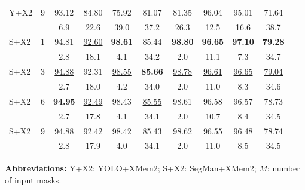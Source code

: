 \documentclass[preprint,12pt]{elsarticle}
\begin{document}
\begin{table}[t]
\begin{tabular}{lccccccccc}
\rowcolor{gray!12}
Y+X2
 & 9
 & 93.12 & 84.80 & 75.92 & 81.07
 & 81.35 & 96.04 & 95.01 & 71.64 \\\rowcolor{gray!12}
 &
 & 6.9 & 22.6 & 39.0 & 37.2
 & 26.3 & 12.5 & 16.6 & 38.7 \\

\midrule

S+X2
 & 1
 & 94.81 & \underline{92.60} & \textbf{98.61} & 85.44
 & \textbf{98.80} & \textbf{96.65} & \textbf{97.10} & \textbf{79.28} \\
 &
 & 2.8 & 18.1 & 4.1 & 34.2
 & 2.0 & 11.1 & 7.3 & 34.7 \\

\rowcolor{gray!12}
S+X2
 & 3
 & \underline{94.88} & 92.31 & \underline{98.55} & \textbf{85.66}
 & \underline{98.78} & \underline{96.61} & \underline{96.65} & \underline{79.04} \\\rowcolor{gray!12}
 &
 & 2.7 & 18.0 & 4.2 & 34.0
 & 2.0 & 11.0 & 8.3 & 34.6 \\

S+X2
 & 6
 & \textbf{94.95} & \underline{92.49} & 98.43 & \underline{85.55}
 & 98.61 & 96.58 & 96.57 & 78.73 \\
 &
 & 2.7 & 17.8 & 4.1 & 34.1
 & 2.0 & 10.7 & 8.4 & 34.5 \\

\rowcolor{gray!12}
S+X2
 & 9
 & 94.88 & 92.42 & 98.42 & 85.43
 & 98.62 & 96.55 & 96.48 & 78.74 \\\rowcolor{gray!12}
 &
 & 2.8 & 17.9 & 4.0 & 34.1
 & 2.0 & 11.0 & 8.5 & 34.5 \\

\bottomrule
\end{tabular}

\vspace{2mm}
\scriptsize
\textbf{Abbreviations:}
Y+X2: YOLO+XMem2; S+X2: SegMan+XMem2;  
$M$: number of input masks.
\end{table}
\end{document}
